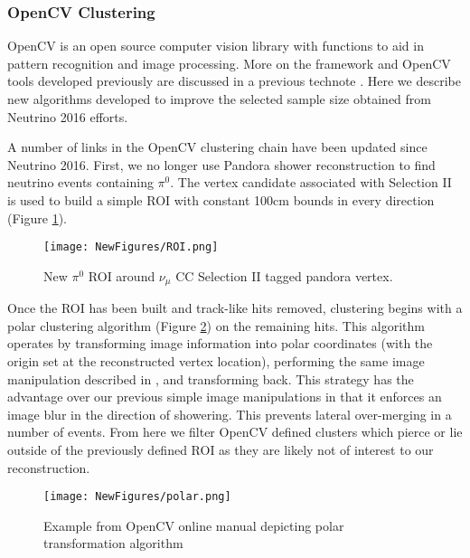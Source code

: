 \documentclass[12pt]{article}
\begin{document}
\subsubsection{OpenCV Clustering}
OpenCV is an open source computer vision library with functions to aid in pattern recognition and image processing. More on the framework and OpenCV tools developed previously are discussed in a previous technote \cite{bib:5856}. Here we describe new algorithms developed to improve the selected sample size obtained from Neutrino 2016 efforts\cite{bib:5864}.
\par A number of links in the OpenCV clustering chain have been updated since Neutrino 2016. First, we no longer use Pandora shower reconstruction to find neutrino events containing $\pi^0$. The vertex candidate associated with Selection II is used to build a simple ROI with constant 100cm bounds in every direction (Figure \ref{fig:roi}). 

\begin{figure}[h!]
\centering
\texttt{[image: NewFigures/ROI.png]}
\caption{New $\pi^0$ ROI around $\nu_\mu$ CC Selection II tagged pandora vertex. }
\label{fig:roi}
\end{figure}

\par Once the ROI has been built and track-like hits removed, clustering begins with a polar clustering algorithm (Figure \ref{fig:polar}) on the remaining hits. This algorithm operates by transforming image information into polar coordinates (with the origin set at the reconstructed vertex location), performing the same image manipulation described in \cite{bib:5856}, and transforming back. This strategy has the advantage over our previous simple image manipulations in that it enforces an image blur in the direction of showering. This prevents lateral over-merging in a number of events. From here we filter OpenCV defined clusters which pierce or lie outside of the previously defined ROI as they are likely not of interest to our reconstruction. 

\begin{figure}[h!]
\centering
\texttt{[image: NewFigures/polar.png]}
\caption{ Example from OpenCV online manual depicting polar transformation algorithm }
\label{fig:polar}
\end{figure}
\end{document}
